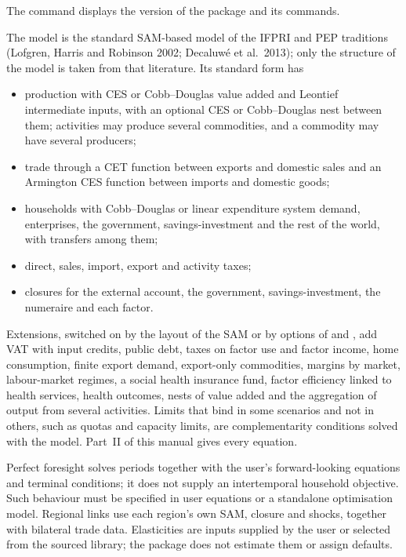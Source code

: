 The command  displays the version of the package and its commands.


\begin{stsyntax}
\end{stsyntax}



The model is the standard SAM-based model of the IFPRI and PEP traditions
(Lofgren, Harris and Robinson 2002; Decaluw\'e et al.\ 2013); only the
structure of the model is taken from that literature. Its standard form has
\begin{itemize}
\item production with CES or Cobb--Douglas value added and Leontief
intermediate inputs, with an optional CES or Cobb--Douglas nest between them;
activities may produce several commodities, and a commodity may have several
producers;
\item trade through a CET function between exports and domestic sales and an
Armington CES function between imports and domestic goods;
\item households with Cobb--Douglas or linear expenditure system demand,
enterprises, the government, savings-investment and the rest of the world,
with transfers among them;
\item direct, sales, import, export and activity taxes;
\item closures for the external account, the government, savings-investment,
the numeraire and each factor.
\end{itemize}
Extensions, switched on by the layout of the SAM or by options of
 and , add VAT with input credits, public
debt, taxes on factor use and factor income, home consumption, finite export
demand, export-only commodities, margins by market, labour-market regimes, a
social health insurance fund, factor efficiency linked to health services,
health outcomes, nests of value added and the aggregation of output from
several activities. Limits that bind in some scenarios and not in others,
such as quotas and capacity limits, are complementarity conditions solved with
the model. Part~II of this manual gives every equation.

Perfect foresight solves periods together with the user's forward-looking
equations and terminal conditions; it does not supply an intertemporal
household objective. Such behaviour must be specified in user equations or
a standalone optimisation model. Regional links use each region's own SAM,
closure and shocks, together with bilateral trade data. Elasticities are
inputs supplied by the user or selected from the sourced library; the
package does not estimate them or assign defaults.

